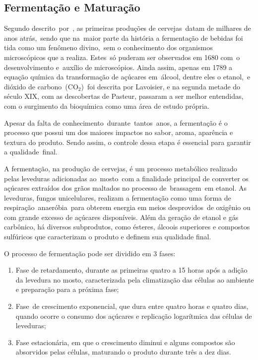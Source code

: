 \subsection{Fermentação e Maturação}


Segundo descrito por , as primeiras produções de
cervejas datam de milhares de anos atrás, sendo que na maior parte da história a
fermentação de bebidas foi tida como um fenômeno divino, sem o conhecimento dos
organismos microscópicos que a realiza. Estes só puderam ser observados em 1680
com o desenvolvimento e auxílio de microscópios. Ainda assim, apenas em 1789 a
equação química da transformação de açúcares em álcool, dentre eles o etanol, e
dióxido de carbono ($\mathrm{CO_2}$) foi descrita por Lavoisier, e na segunda metade do século
XIX, com as descobertas de Pasteur, passaram a ser melhor entendidas, com o
surgimento da bioquímica como uma área de estudo própria. 


Apesar da falta de conhecimento durante tantos anos, a fermentação é o processo
que possui um dos maiores impactos no sabor, aroma, aparência e textura do
produto. Sendo assim, o controle dessa etapa é essencial para garantir a
qualidade final.  


A fermentação, na produção de cervejas, é um processo metabólico realizado pelas
leveduras adicionadas ao mosto com a finalidade principal de converter os açúcares
extraídos dos grãos maltados no processo de brassagem em etanol. As leveduras,
fungos unicelulares, realizam a fermentação como uma forma de
respiração anaeróbia para obterem energia em meios desprovidos de oxigênio ou
com grande excesso de açúcares disponíveis. Além da geração de etanol e gás
carbônico, há diversos subprodutos, como ésteres, álcoois superiores e compostos
sulfúricos que caracterizam o produto e definem sua qualidade final. 


O processo de fermentação pode ser dividido em 3 fases:  
\begin{enumerate}
    \item Fase de retardamento, durante as primeiras quatro a 15 horas após a adição
da levedura no mosto, caracterizada pela climatização das células ao
ambiente e preparação para a próxima fase;
    \item Fase de crescimento exponencial, que dura entre quatro horas e quatro dias,
quando ocorre o consumo dos açúcares e replicação logarítmica das células
de leveduras;
    \item Fase estacionária, em que o crescimento diminui e alguns compostos são
absorvidos pelas células, maturando o produto durante três a dez dias.
\end{enumerate}


